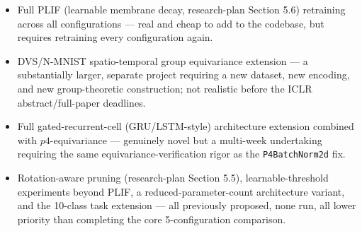 \documentclass[11pt]{article}
\begin{document}
\begin{itemize}[leftmargin=1.5em]
\item Full PLIF (learnable membrane decay, research-plan Section 5.6) retraining across all
configurations --- real and cheap to add to the codebase, but requires retraining every
configuration again.
\item DVS/N-MNIST spatio-temporal group equivariance extension --- a substantially larger, separate
project requiring a new dataset, new encoding, and new group-theoretic construction; not realistic
before the ICLR abstract/full-paper deadlines.
\item Full gated-recurrent-cell (GRU/LSTM-style) architecture extension combined with
$p4$-equivariance --- genuinely novel but a multi-week undertaking requiring the same
equivariance-verification rigor as the \texttt{P4BatchNorm2d} fix.
\item Rotation-aware pruning (research-plan Section 5.5), learnable-threshold experiments beyond
PLIF, a reduced-parameter-count architecture variant, and the 10-class task extension --- all
previously proposed, none run, all lower priority than completing the core 5-configuration
comparison.
\end{itemize}
\end{document}
